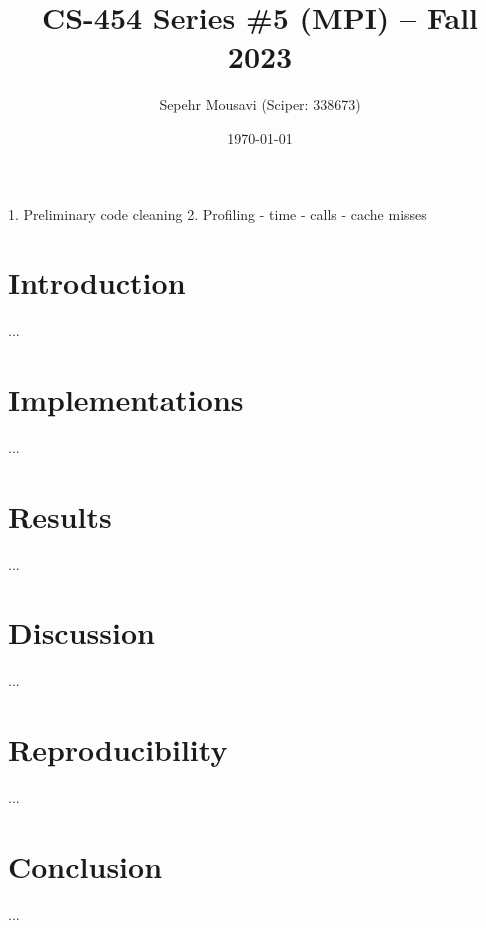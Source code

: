 \documentclass[10pt,journal,compsocconf]{IEEEtran}
\title{CS-454 Series \#5 (MPI) -- Fall 2023}
\author{
  Sepehr Mousavi (Sciper: 338673)
}
\date{\today}
\begin{document}
\maketitle


1. Preliminary code cleaning
2. Profiling
    - time
    - calls
    - cache misses

\section{Introduction}
...

\section{Implementations}
...

\section{Results}
...

\section{Discussion}
...

\section{Reproducibility}
...

\section{Conclusion}
...
\end{document}
